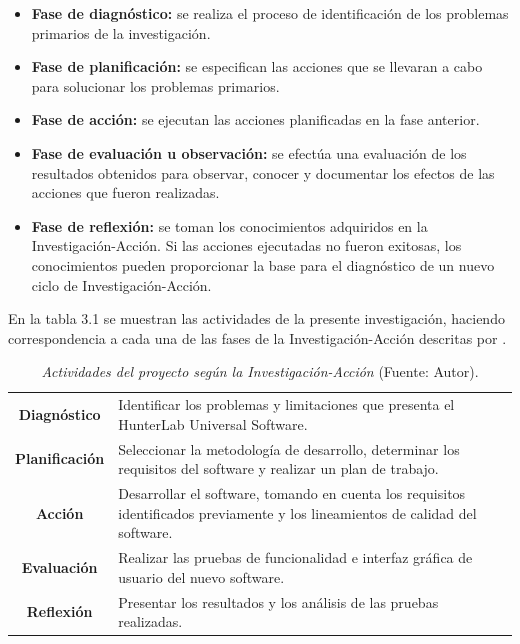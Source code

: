 	\begin{itemize}
		\item \textbf{Fase de diagn\'{o}stico:} se realiza el proceso de identificaci\'{o}n de los problemas primarios de la investigaci\'{o}n.
		\item \textbf{Fase de planificaci\'{o}n:} se especifican las acciones que se llevaran a cabo para solucionar los problemas primarios.
		\item \textbf{Fase de acci\'{o}n:} se ejecutan las acciones planificadas en la fase anterior.
		\item \textbf{Fase de evaluaci\'{o}n u observaci\'{o}n:} se efect\'{u}a una evaluaci\'{o}n de los resultados obtenidos para observar, conocer y documentar los efectos de las acciones que fueron realizadas.
		\item \textbf{Fase de reflexi\'{o}n:} se toman los conocimientos adquiridos en la Investigaci\'{o}n-Acci\'{o}n. Si las acciones ejecutadas no fueron exitosas, los conocimientos pueden proporcionar la base para el diagn\'{o}stico de un nuevo ciclo de Investigaci\'{o}n-Acci\'{o}n.
	\end{itemize}

En la tabla 3.1 se muestran las actividades de la presente investigaci\'{o}n, haciendo correspondencia a cada una de las fases de la Investigaci\'{o}n-Acci\'{o}n descritas por \cite{Baskerville}.

	\begin{table}[t]
		\small
		\caption[Actividades del proyecto seg\'{u}n la Investigaci\'{o}n-Acci\'{o}n]{\textit{Actividades del proyecto seg\'{u}n la Investigaci\'{o}n-Acci\'{o}n} (Fuente: Autor).}
		\centering
		\setlength{\extrarowheight}{\altocelda}
		\begin{tabulary}{\anchotabla}{|c|J|}
			\hline
			 & \\ \hline
			\textbf{Diagn\'{o}stico} & Identificar los problemas y limitaciones que presenta el HunterLab Universal Software.\\ \hline
			\textbf{Planificaci\'{o}n} & Seleccionar la metodolog\'{i}a de desarrollo, determinar los requisitos del software y realizar un plan de trabajo.
\\ \hline
			\textbf{Acci\'{o}n} & Desarrollar el software, tomando en cuenta los requisitos identificados previamente y los lineamientos de calidad del software.\\ \hline
			\textbf{Evaluaci\'{o}n} & Realizar las pruebas de funcionalidad e interfaz gr\'{a}fica de usuario del nuevo software.\\ \hline
			\textbf{Reflexi\'{o}n} & Presentar los resultados y los an\'{a}lisis de las pruebas realizadas.\\ \hline
		\end{tabulary}
	\end{table}


